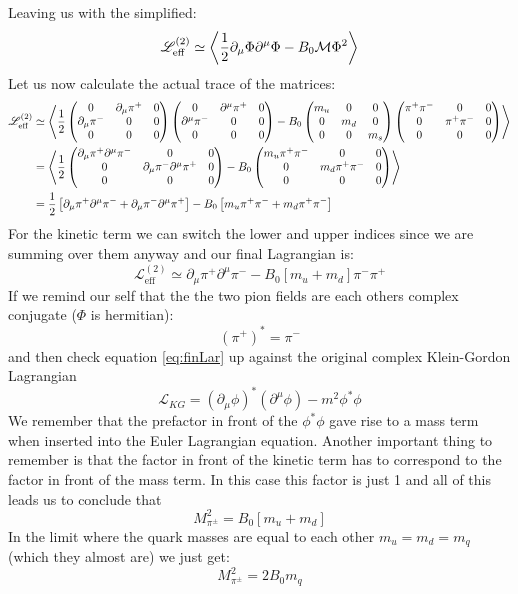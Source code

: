 \documentclass[a4,10pt,titlepage]{article}
\renewcommand\[{\begin{equation*}}
\renewcommand\]{\end{equation*}}
\newcommand{\be}{\begin{equation}}
\newcommand{\ee}{\end{equation}}
\numberwithin{equation}{section}
\newcommand{\lp}{\left}
\newcommand{\rp}{\right}
\newcommand{\Lar}{\mathscr{L}}
\newcommand{\half}{\frac{1}{2}}
\begin{document}
Leaving us with the simplified:
\be
\Lar_{ \text{eff}}^{(2)}\simeq\expval{ \half\partial_\mu\Phi\partial^\mu\Phi-B_0\mathcal{M}\Phi^2}
\ee
Let us now calculate the actual trace of the matrices:
\begin{align*}
    \Lar_{ \text{eff}}^{(2)}&\simeq
\expval{
\half
\begin{pmatrix}
0 &\partial_\mu \pi^+& 0\\
\partial_\mu \pi^- &0 & 0\\
0 & 0 & 0
\end{pmatrix}
\begin{pmatrix}
0 &\partial^\mu \pi^+& 0\\
\partial^\mu \pi^- &0 & 0\\
0 & 0 & 0
\end{pmatrix}
-B_0
\begin{pmatrix}
m_u & 0 & 0\\
0 & m_d & 0\\
0 & 0 & m_s\\
\end{pmatrix}
\begin{pmatrix}
    \pi^+\pi^- & 0 & 0\\
    0 & \pi^+\pi^- & 0\\
    0 & 0 & 0
\end{pmatrix}
}\\
&=
\expval{
\half
\begin{pmatrix}
\partial_\mu \pi^+ \partial^\mu \pi^- & 0 & 0\\
0 & \partial_\mu \pi^- \partial^\mu \pi^+ & 0\\
0 & 0 & 0
\end{pmatrix}
-B_0
\begin{pmatrix}
    m_u\pi^+\pi^- & 0 & 0\\
    0 & m_d\pi^+\pi^- & 0\\
    0 & 0 & 0
\end{pmatrix}
}\\
&=\half\lp[\partial_\mu \pi^+ \partial^\mu \pi^-+ \partial_\mu \pi^- \partial^\mu \pi^+ \rp]-B_0\lp[ m_u\pi^+\pi^-+ m_d\pi^+\pi^- \rp] 
\end{align*}
For the kinetic term we can switch the lower and upper indices since we are summing over them anyway and our final Lagrangian is:
\be \label{eq:finLar}
\Lar_{\text{eff}}^{(2)}\simeq \partial_\mu \pi^+\partial^\mu \pi^- -B_0\lp[m_u+m_d \rp]\pi^-\pi^+
\ee
If we remind our self that the the two pion fields are each others complex conjugate ($\Phi$ is hermitian):
\[
\lp(\pi^+ \rp)^*=\pi^-
\]
and then check equation \ref{eq:finLar} up against the original complex Klein-Gordon Lagrangian
\be
\Lar_{KG}=\lp(\partial_\mu \phi\rp)^* \lp(\partial^\mu \phi\rp) - m^2\phi^*\phi
\ee
We remember that the prefactor in front of the $\phi^*\phi$ gave rise to a mass term when inserted into the Euler Lagrangian equation. Another important thing to remember is that the factor in front of the kinetic term has to correspond to the factor in front of the mass term. In this case this factor is just 1 and all of this leads us to conclude that
\be
M_{\pi^\pm}^2=B_0\lp[m_u+m_d \rp]
\ee
In the limit where the quark masses are equal to each other $m_u=m_d=m_q$ (which they almost are) we just get:
\be
M_{\pi^\pm}^2=2B_0 m_q
\ee
\end{document}
